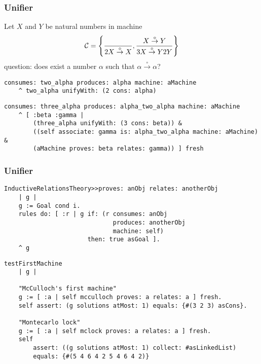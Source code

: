 \documentclass{beamer}
\begin{document}
\begin{frame}[fragile]
\frametitle{Unifier}
Let $X$ and $Y$ be natural numbers in machine 
\begin{displaymath}
\mathcal{C} =  \left \lbrace{ \over 2X \stackrel{\circ}{\rightarrow} X} , {X \stackrel{\circ}{\rightarrow} Y \over 3X \stackrel{\circ}{\rightarrow} Y 2 Y} \right \rbrace
\end{displaymath}
question: does exist a number $\alpha$ such that $ \alpha \stackrel{\circ}{\rightarrow} \alpha $?
\begin{verbatim}
consumes: two_alpha produces: alpha machine: aMachine
    ^ two_alpha unifyWith: (2 cons: alpha)
\end{verbatim}
\begin{verbatim}
consumes: three_alpha produces: alpha_two_alpha machine: aMachine
    ^ [ :beta :gamma | 
        (three_alpha unifyWith: (3 cons: beta)) &
        ((self associate: gamma is: alpha_two_alpha machine: aMachine) & 
        (aMachine proves: beta relates: gamma)) ] fresh
\end{verbatim}
\end{frame}

\begin{frame}[fragile]
\frametitle{Unifier}
\begin{verbatim}
InductiveRelationsTheory>>proves: anObj relates: anotherObj
    | g |
    g := Goal cond i.
    rules do: [ :r | g if: (r consumes: anObj 
                              produces: anotherObj 
                              machine: self) 
                       then: true asGoal ].
    ^ g
\end{verbatim}
\begin{verbatim}
testFirstMachine
    | g |

    "McCulloch's first machine"
    g := [ :a | self mcculloch proves: a relates: a ] fresh.
    self assert: (g solutions atMost: 1) equals: {#(3 2 3) asCons}.

    "Montecarlo lock"
    g := [ :a | self mclock proves: a relates: a ] fresh.
    self
        assert: ((g solutions atMost: 1) collect: #asLinkedList)
        equals: {#(5 4 6 4 2 5 4 6 4 2)}
\end{verbatim}
\end{frame}
\end{document}

